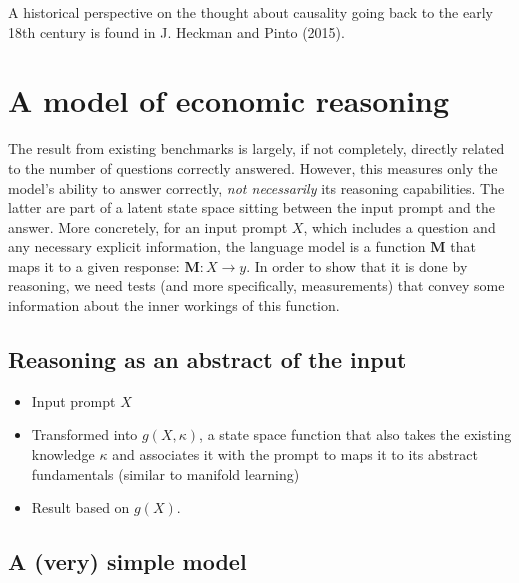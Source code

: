 \documentclass[
]{article}
\begin{document}
A historical perspective on the thought about causality going back to
the early 18th century is found in J. Heckman and Pinto (2015).

\section{A model of economic
reasoning}\label{a-model-of-economic-reasoning}

The result from existing benchmarks is largely, if not completely,
directly related to the number of questions correctly answered. However,
this measures only the model's ability to answer correctly, \emph{not
necessarily} its reasoning capabilities. The latter are part of a latent
state space sitting between the input prompt and the answer. More
concretely, for an input prompt \(X\), which includes a question and any
necessary explicit information, the language model is a function
\(\mathbf{M}\) that maps it to a given response:
\(\mathbf{M} : X \to y\). In order to show that it is done by reasoning,
we need tests (and more specifically, measurements) that convey some
information about the inner workings of this function.

\subsection{Reasoning as an abstract of the
input}\label{reasoning-as-an-abstract-of-the-input}

\begin{itemize}
\item
  Input prompt \(X\)
\item
  Transformed into \(g(X, \kappa)\), a state space function that also
  takes the existing knowledge \(\kappa\) and associates it with the
  prompt to maps it to its abstract fundamentals (similar to manifold
  learning)
\item
  Result based on \(g(X)\).
\end{itemize}

\subsection{A (very) simple model}\label{a-very-simple-model}
\end{document}
